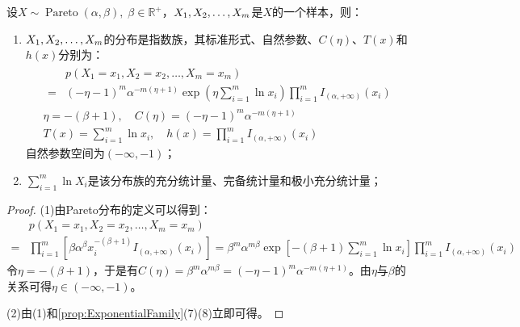 \begin{theorem}
	设$X\sim\operatorname{Pareto}(\alpha,\beta),\;\beta\in\mathbb{R}^{+}$，$X_1, X_2, \dots, X_{m}$是$X$的一个样本，则：
	\begin{enumerate}
		\item $X_1, X_2, \dots, X_{m}$的分布是指数族，其标准形式、自然参数、$C(\eta)$、$T(x)$和$h(x)$分别为：
		\begin{gather*}
			\begin{aligned}
				&p(X_1=x_1,X_2=x_2,\dots,X_m=x_m) \\
				=&(-\eta-1)^m\alpha^{-m(\eta+1)}\exp\left(\eta\sum_{i=1}^{m}\ln x_i\right)\prod_{i=1}^{m}I_{(\alpha,+\infty)}(x_i)
			\end{aligned} \\
			\eta=-(\beta+1),\quad C(\eta)=(-\eta-1)^m\alpha^{-m(\eta+1)} \\
			T(x)=\sum_{i=1}^{m}\ln x_i,\quad h(x)=\prod_{i=1}^{m}I_{(\alpha,+\infty)}(x_i)
		\end{gather*}
		自然参数空间为$(-\infty,-1)$；
		\item $\sum\limits_{i=1}^{m}\ln X_i$是该分布族的充分统计量、完备统计量和极小充分统计量；
	\end{enumerate}
\end{theorem}
\begin{proof}
	(1)由Pareto分布的定义可以得到：
	\begin{align*}
		&p(X_1=x_1,X_2=x_2,\dots,X_m=x_m) \\
		=&\prod_{i=1}^{m}\left[\beta\alpha^{\beta}x_i^{-(\beta+1)}I_{(\alpha,+\infty)}(x_i)\right]=\beta^m\alpha^{m\beta}\exp\left[-(\beta+1)\sum_{i=1}^{m}\ln x_i\right]\prod_{i=1}^{m}I_{(\alpha,+\infty)}(x_i)
	\end{align*}
	令$\eta=-(\beta+1)$，于是有$C(\eta)=\beta^{m}\alpha^{m\beta}=(-\eta-1)^m\alpha^{-m(\eta+1)}$。由$\eta$与$\beta$的关系可得$\eta\in(-\infty,-1)$。\par
	(2)由(1)和\cref{prop:ExponentialFamily}(7)(8)立即可得。
\end{proof}

